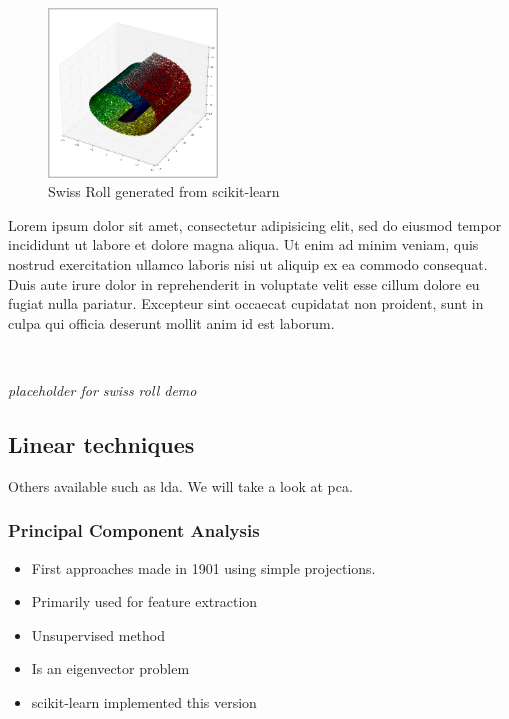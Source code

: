 \begin{figure}
	\centering
	\includegraphics[width=0.4\textwidth]{external_content/graphs/swiss_roll.png}
	\captionsetup{justification=centering}
	\caption{Swiss Roll generated from scikit-learn \cite{scikit-learn}}
    \label{fig:swissrollfull}
\end{figure}

Lorem ipsum dolor sit amet, consectetur adipisicing elit, sed do eiusmod
tempor incididunt ut labore et dolore magna aliqua. Ut enim ad minim veniam,
quis nostrud exercitation ullamco laboris nisi ut aliquip ex ea commodo
consequat. Duis aute irure dolor in reprehenderit in voluptate velit esse
cillum dolore eu fugiat nulla pariatur. Excepteur sint occaecat cupidatat non
proident, sunt in culpa qui officia deserunt mollit anim id est laborum.

\clearpage

\ 

\begin{center}
	\textit{placeholder for swiss roll demo}
\end{center}


\clearpage


\subsection{Linear techniques}

Others available such as \gls{lda}. We will take a look at \gls{pca}.


\subsubsection{Principal Component Analysis}

\begin{itemize}
	\item First approaches made in 1901 using simple projections. \cite{pearson1901liii}
	\item Primarily used for feature extraction \cite{PythonMachineLearningCh5}
	\item Unsupervised method \cite{PythonMachineLearningCh5}
	\item Is an eigenvector problem \cite{MultilinearSubspaceLearningCh2}
	\item scikit-learn implemented this version \cite{minka2000automatic}
\end{itemize}

